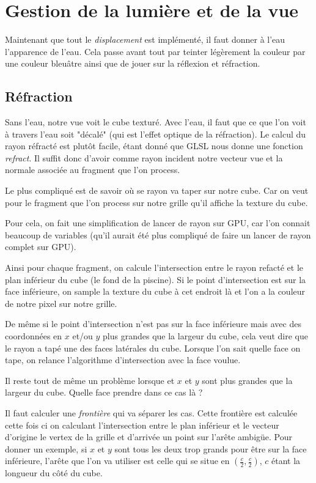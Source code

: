 \documentclass[a4paper,11pt,leqno]{article}
\begin{document}
\section{Gestion de la lumière et de la vue}

Maintenant que tout le \emph{displacement} est implémenté, il faut donner à l'eau l'apparence de l'eau. Cela passe avant tout par teinter légèrement la couleur par une couleur bleuâtre ainsi que de jouer sur la réflexion et réfraction.

\subsection{Réfraction}

Sans l'eau, notre vue voit le cube texturé. Avec l'eau, il faut que ce que l'on voit à travers l'eau soit "décalé" (qui est l'effet optique de la réfraction). Le calcul du rayon réfracté est plutôt facile, étant donné que GLSL nous donne une fonction \emph{refract}. Il suffit donc d'avoir comme rayon incident notre vecteur vue et la normale associée au fragment que l'on process.

Le plus compliqué est de savoir où se rayon va taper sur notre cube. Car on veut pour le fragment que l'on process sur notre grille qu'il affiche la texture du cube.

Pour cela, on fait une simplification de lancer de rayon sur GPU, car l'on connait beaucoup de variables (qu'il aurait été plus compliqué de faire un lancer de rayon complet sur GPU).

Ainsi pour chaque fragment, on calcule l'intersection entre le rayon refacté et le plan inférieur du cube (le fond de la piscine). Si le point d'intersection est sur la face inférieure, on sample la texture du cube à cet endroit là et l'on a la couleur de notre pixel sur notre grille.

De même si le point d'intersection n'est pas sur la face inférieure mais avec des coordonnées en $x$ et/ou $y$ plus grandes que la largeur du cube, cela veut dire que le rayon a tapé une des faces latérales du cube. Lorsque l'on sait quelle face on tape, on relance l'algorithme d'intersection avec la face voulue.

Il reste tout de même un problème lorsque et $x$ et $y$ sont plus grandes que la largeur du cube. Quelle face prendre dans ce cas là ?

Il faut calculer une \emph{frontière} qui va séparer les cas. Cette frontière est calculée cette fois ci on calculant l'intersection entre le plan inférieur et le vecteur d'origine le vertex de la grille et d'arrivée un point sur l'arête ambigüe. Pour donner un exemple, si $x$ et $y$ sont tous les deux trop grands pour être sur la face inférieure, l'arête que l'on va utiliser est celle qui se situe en $(\frac{c}{2}, \frac{c}{2})$, $c$ étant la longueur du côté du cube.
\end{document}
